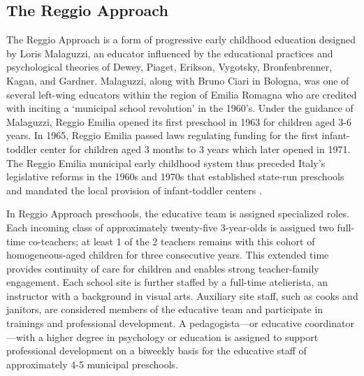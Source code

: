\subsection{The Reggio Approach}

The Reggio Approach is a form of progressive early childhood education designed by Loris Malaguzzi, an educator influenced by the educational practices and psychological theories of Dewey, Piaget, Erikson, Vygotsky, Bronfenbrenner, Kagan, and Gardner. Malaguzzi, along with Bruno Ciari in Bologna, was one of several left-wing educators within the region of Emilia Romagna who are credited with inciting a `municipal school revolution' in the 1960's. Under the guidance of Malaguzzi, Reggio Emilia opened its first preschool in 1963 for children aged 3-6 years. In 1965, Reggio Emilia passed laws regulating funding for the first infant-toddler center for children aged 3 months to 3 years which later opened in 1971. The Reggio Emilia municipal early childhood system thus preceded Italy's legislative reforms in the 1960s and 1970s that established state-run preschools and mandated the local provision of infant-toddler centers \citep{Cagliari-etal-eds_2016_BOOK_Loris-Malaguzzi}. 

In Reggio Approach preschools, the educative team is assigned specialized roles. Each incoming class of approximately twenty-five 3-year-olds is assigned two full-time co-teachers; at least 1 of the 2 teachers remains with this cohort of homogeneous-aged children for three consecutive years. This extended time provides continuity of care for children and enables strong teacher-family engagement. Each school site is further staffed by a full-time atelierista, an instructor with a background in visual arts. Auxiliary site staff, such as cooks and janitors, are considered members of the educative team and participate in trainings and professional development. A pedagogista---or educative coordinator---with a higher degree in psychology or education is assigned to support professional development on a biweekly basis for the educative staff of approximately 4-5 municipal preschools. 

